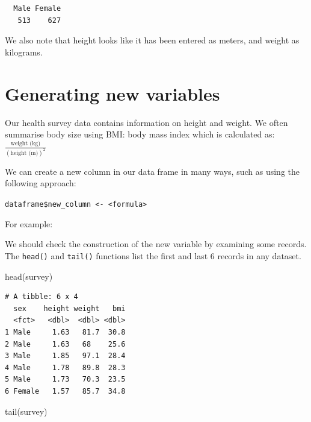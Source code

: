 \documentclass[
  a4paper,
]{memoir}
\newenvironment{Shaded}{\begin{snugshade}}{\end{snugshade}}
\newcommand{\DecValTok}[1]{\textcolor[rgb]{0.00,0.00,0.00}{#1}}
\newcommand{\FunctionTok}[1]{\textcolor[rgb]{0.00,0.00,0.00}{#1}}
\newcommand{\NormalTok}[1]{\textcolor[rgb]{0.00,0.00,0.00}{#1}}
\newcommand{\OtherTok}[1]{\textcolor[rgb]{0.00,0.00,0.00}{#1}}
\newcommand{\SpecialCharTok}[1]{\textcolor[rgb]{0.00,0.00,0.00}{#1}}
\begin{document}
\begin{verbatim}
  Male Female 
   513    627 
\end{verbatim}

We also note that height looks like it has been entered as meters, and
weight as kilograms.

\section{Generating new variables}\label{generating-new-variables-1}

Our health survey data contains information on height and weight. We
often summarise body size using BMI: body mass index which is calculated
as: \(\frac{\text{weight (kg)}}{(\text{height (m)})^2}\)

We can create a new column in our data frame in many ways, such as using
the following approach:

\texttt{dataframe\$new\_column\ \textless{}-\ \textless{}formula\textgreater{}}

For example:

\begin{Shaded}
\end{Shaded}

We should check the construction of the new variable by examining some
records. The \texttt{head()} and \texttt{tail()} functions list the
first and last 6 records in any dataset.

\begin{Shaded}
\begin{Highlighting}[]
\FunctionTok{head}\NormalTok{(survey)}
\end{Highlighting}
\end{Shaded}

\begin{verbatim}
# A tibble: 6 x 4
  sex    height weight   bmi
  <fct>   <dbl>  <dbl> <dbl>
1 Male     1.63   81.7  30.8
2 Male     1.63   68    25.6
3 Male     1.85   97.1  28.4
4 Male     1.78   89.8  28.3
5 Male     1.73   70.3  23.5
6 Female   1.57   85.7  34.8
\end{verbatim}

\begin{Shaded}
\begin{Highlighting}[]
\FunctionTok{tail}\NormalTok{(survey)}
\end{Highlighting}
\end{Shaded}
\end{document}
